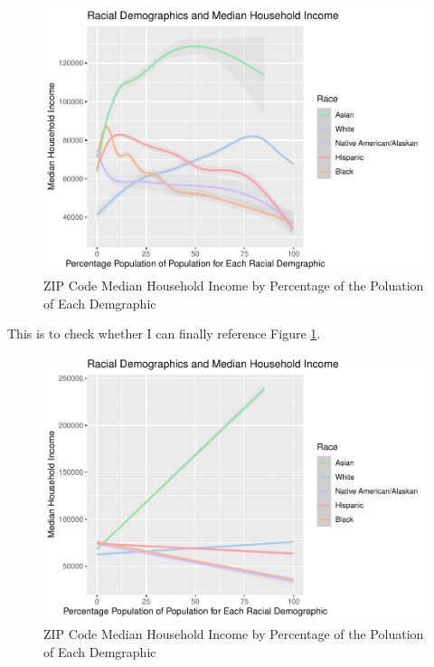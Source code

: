 \documentclass[
  man,floatsintext]{apa7}
\begin{document}
\begin{figure}
\centering
\includegraphics{ZIP-Diversity-Income-Markdown_files/figure-latex/race-median-income-smooth-fig-1.pdf}
\caption{\label{fig:race-median-income-smooth-fig}ZIP Code Median Household Income by Percentage of the Poluation of Each Demgraphic}
\end{figure}

This is to check whether I can finally reference Figure \ref{fig:race-median-income-smooth-fig}.

\begin{figure}
\centering
\includegraphics{ZIP-Diversity-Income-Markdown_files/figure-latex/race-median-income-lm-fig-1.pdf}
\caption{\label{fig:race-median-income-lm-fig}ZIP Code Median Household Income by Percentage of the Poluation of Each Demgraphic}
\end{figure}
\end{document}
